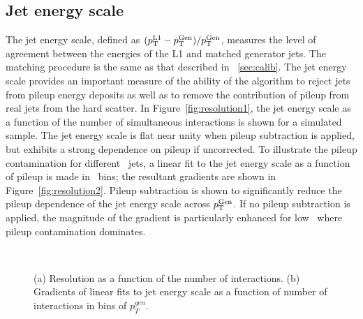 \subsection{Jet energy scale}

The jet energy scale, defined as $({p_{\text T}^{\text{L1}}}-{p_{\text T}^{\text{Gen}}})/{p_{\text T}^{\text{Gen}}}$, measures the level of agreement between the energies of the 
L1 and matched generator jets. The matching procedure is the same as that described in \Section~\ref{sec:calib}.
The jet energy scale provides an important measure of the ability of the algorithm to reject jets from pileup
energy deposits as well as to remove the contribution of pileup from real jets from the hard scatter.
In Figure~\ref{fig:resolution1}, the jet energy scale as a function of the number of simultaneous interactions is shown for
a simulated \ttbar sample. The jet energy scale is flat near unity when pileup subtraction is applied,
but exhibits a strong dependence on pileup if uncorrected. To illustrate the pileup contamination for different
\Genpt~jets, a linear fit to the jet energy scale as a function of pileup is made in \Genpt~bins; the resultant gradients
are shown in Figure~\ref{fig:resolution2}. Pileup subtraction is shown to significantly reduce the 
pileup dependence of the jet energy scale across ${p_{\text T}^{\text{Gen}}}$. If no pileup subtraction is applied, 
the magnitude of the gradient is particularly enhanced for low \Genpt~where pileup contamination dominates. 

\begin{figure}
    \begin{center} 
	~
	\caption{(a) Resolution as a function of the number of interactions. (b) Gradients of linear fits to 
	    jet energy scale as a function of number of interactions in bins of $p^{gen}_{T}$.}
	    \label{fig:label:resolution}
    \end{center} 
\end{figure}

